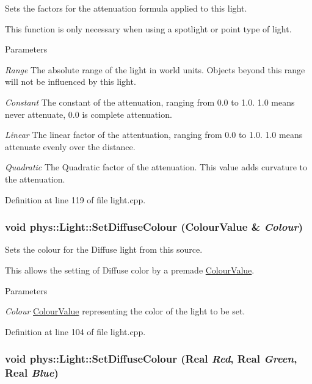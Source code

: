 Sets the factors for the attenuation formula applied to this light. 

This function is only necessary when using a spotlight or point type of light. 
\begin{DoxyParams}{Parameters}
\item[{\em Range}]The absolute range of the light in world units. Objects beyond this range will not be influenced by this light. \item[{\em Constant}]The constant of the attenuation, ranging from 0.0 to 1.0. 1.0 means never attenuate, 0.0 is complete attenuation. \item[{\em Linear}]The linear factor of the attentuation, ranging from 0.0 to 1.0. 1.0 means attenuate evenly over the distance. \item[{\em Quadratic}]The Quadratic factor of the attenuation. This value adds curvature to the attenuation. \end{DoxyParams}


Definition at line 119 of file light.cpp.

\hypertarget{classphys_1_1Light_ac2e20bac2841e970f231d24d068e7b98}{
\subsubsection[{SetDiffuseColour}]{\setlength{\rightskip}{0pt plus 5cm}void phys::Light::SetDiffuseColour ({\bf ColourValue} \& {\em Colour})}}
\label{dc/df1/classphys_1_1Light_ac2e20bac2841e970f231d24d068e7b98}


Sets the colour for the Diffuse light from this source. 

This allows the setting of Diffuse color by a premade \hyperlink{classphys_1_1ColourValue}{ColourValue}. 
\begin{DoxyParams}{Parameters}
\item[{\em Colour}]\hyperlink{classphys_1_1ColourValue}{ColourValue} representing the color of the light to be set. \end{DoxyParams}


Definition at line 104 of file light.cpp.

\hypertarget{classphys_1_1Light_aa54aed6085b348631daa26bc820bb715}{
\subsubsection[{SetDiffuseColour}]{\setlength{\rightskip}{0pt plus 5cm}void phys::Light::SetDiffuseColour ({\bf Real} {\em Red}, \/  {\bf Real} {\em Green}, \/  {\bf Real} {\em Blue})}}
\label{dc/df1/classphys_1_1Light_aa54aed6085b348631daa26bc820bb715}


